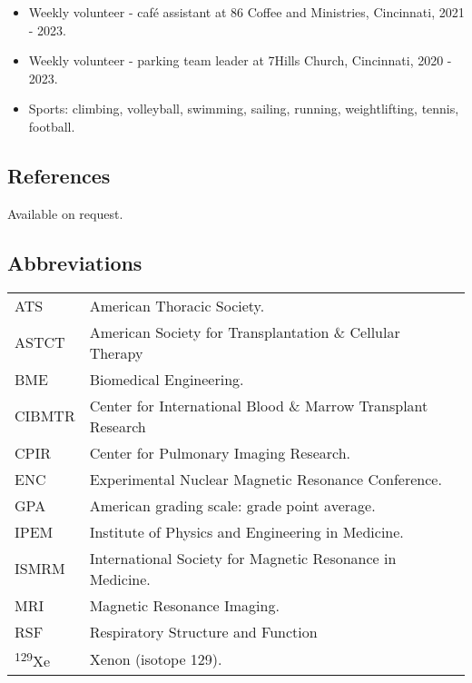\documentclass[12pt,]{scrartcl}
\begin{document}
\begin{itemize}
  \leftskip-0.25in
  \item Weekly volunteer - caf\'{e} assistant at 86 Coffee and Ministries, Cincinnati, 2021 - 2023.
  \item Weekly volunteer - parking team leader at 7Hills Church, Cincinnati, 2020 - 2023.
  \item Sports: climbing, volleyball, swimming, sailing, running, weightlifting, tennis, football.
\end{itemize}

%

\subsection{References}\label{references}

Available on request.

\newpage

\subsection{Abbreviations}\label{abbreviations}
\begin{table}[h!]
{\def\arraystretch{1.5}\tabcolsep=0pt
\begin{tabular}{p{0.15\linewidth}p{0.85\linewidth}}
    ATS & American Thoracic Society. \\
    ASTCT & American Society for Transplantation \& Cellular Therapy \\
    BME & Biomedical Engineering. \\
    CIBMTR & Center for International Blood \& Marrow Transplant Research \\
    CPIR & Center for Pulmonary Imaging Research. \\
    ENC & Experimental Nuclear Magnetic Resonance Conference. \\
    GPA & American grading scale: grade point average. \\
    IPEM & Institute of Physics and Engineering in Medicine. \\
    ISMRM & International Society for Magnetic Resonance in Medicine. \\
    MRI & Magnetic Resonance Imaging. \\
    RSF & Respiratory Structure and Function \\
    \textsuperscript{129}Xe & Xenon (isotope 129). \\
\end{tabular}%
}
\end{table}
\end{document}
